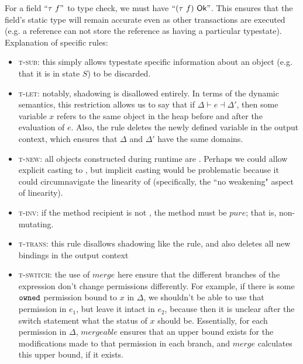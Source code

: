 \documentclass[runningheads,a4paper]{llncs}
\begin{document}
\iffalse

For a field $``\tau\ f"$ to type check, we must have $``(\tau\ f)\ \okS"$. This ensures that the field's static type will remain accurate even as other transactions are executed (e.g. a \readonlyS{} reference can not store the reference as having a particular typestate). \\

Explanation of specific rules:

\begin{itemize}
\item \textsc{t-sub}: this simply allows typestate specific information about an object (e.g. that it is in state $S$) to be discarded.

\item \textsc{t-let}: notably, shadowing is disallowed entirely. In terms of the dynamic semantics, this restriction allows us to say that if $\Delta \vdash e \dashv \Delta'$, then some variable $x$ refers to the same object in the heap before and after the evaluation of $e$. Also, the rule deletes the newly defined variable in the output context, which ensures that $\Delta$ and $\Delta'$ have the same domains.

\item \textsc{t-new}: all objects constructed during runtime are \ownedS{}. Perhaps we could allow explicit casting to \sharedS{}, but implicit casting would be problematic because it could circumnavigate the linearity of \ownedS{} (specifically, the ``no weakening" aspect of linearity).

\item \textsc{t-inv}: if the method recipient is not \ownedS{}, the method must be $pure$; that is, non-mutating.
\item \textsc{t-trans}: this rule disallows shadowing like the  rule, and also deletes all new bindings in the output context
\item \textsc{t-switch}: the use of $merge$ here ensure that the different branches of the expression don't change permissions differently. For example, if there is some $\texttt{owned}{}$ permission bound to $x$ in $\Delta$, we shouldn't be able to use that permission in $e_{1}$, but leave it intact in $e_{2}$, because then it is unclear after the switch statement what the status of $x$ should be. Essentially, for each permission in $\Delta$, $mergeable$ ensures that an upper bound exists for the modifications made to that permission in each branch, and $merge$ calculates this upper bound, if it exists.
\end{itemize}
\end{document}
